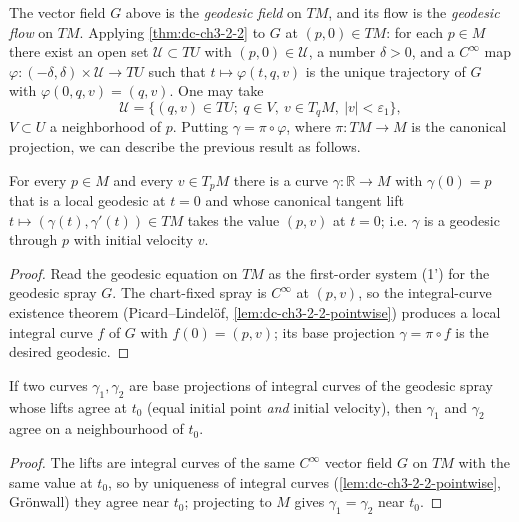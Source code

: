 \begin{definition}
  \label{def:dc-ch3-2-4}


  The vector field $G$ above is the \emph{geodesic field} on $TM$, and its flow is the
  \emph{geodesic flow} on $TM$. Applying \cref{thm:dc-ch3-2-2} to $G$ at $(p,0)\in TM$: for each
  $p\in M$ there exist an open set $\mathcal{U}\subset TU$ with $(p,0)\in\mathcal{U}$,
  a number $\delta>0$, and a $C^\infty$ map $\varphi:(-\delta,\delta)\times\mathcal{U}\to TU$
  such that $t\mapsto\varphi(t,q,v)$ is the unique trajectory of $G$ with
  $\varphi(0,q,v)=(q,v)$. One may take
  $$
  \mathcal{U}=\{(q,v)\in TU;\ q\in V,\ v\in T_qM,\ |v|<\varepsilon_1\},
  $$
  $V\subset U$ a neighborhood of $p$. Putting $\gamma=\pi\circ\varphi$, where
  $\pi:TM\to M$ is the canonical projection, we can describe the previous result as
  follows.
\end{definition}

\begin{lemma}
  \label{lem:dc-ch3-2-5-exist}


  For every $p\in M$ and every $v\in T_pM$ there is a curve $\gamma:\mathbb{R}\to M$
  with $\gamma(0)=p$ that is a local geodesic at $t=0$ and whose canonical tangent
  lift $t\mapsto(\gamma(t),\gamma'(t))\in TM$ takes the value $(p,v)$ at $t=0$; i.e.
  $\gamma$ is a geodesic through $p$ with initial velocity $v$.
\end{lemma}
\begin{proof}
  \sketch

  Read the geodesic equation on $TM$ as the first-order system (1') for the
  geodesic spray $G$. The chart-fixed spray is $C^\infty$ at $(p,v)$, so the
  integral-curve existence theorem (Picard--Lindel\"of,
  \cref{lem:dc-ch3-2-2-pointwise}) produces a local integral curve $f$ of $G$ with
  $f(0)=(p,v)$; its base projection $\gamma=\pi\circ f$ is the desired geodesic.
\end{proof}

\begin{lemma}
  \label{lem:dc-ch3-2-5-unique}


  If two curves $\gamma_1,\gamma_2$ are base projections of integral curves of the
  geodesic spray whose lifts agree at $t_0$ (equal initial point \emph{and} initial
  velocity), then $\gamma_1$ and $\gamma_2$ agree on a neighbourhood of $t_0$.
\end{lemma}
\begin{proof}
  \sketch

  The lifts are integral curves of the same $C^\infty$ vector field $G$ on $TM$
  with the same value at $t_0$, so by uniqueness of integral curves
  (\cref{lem:dc-ch3-2-2-pointwise}, Gr\"onwall) they agree near $t_0$; projecting to $M$
  gives $\gamma_1=\gamma_2$ near $t_0$.
\end{proof}

